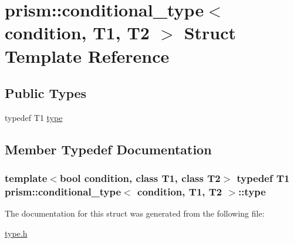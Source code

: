 \hypertarget{structprism_1_1conditional__type}{}\section{prism\+:\+:conditional\+\_\+type$<$ condition, T1, T2 $>$ Struct Template Reference}
\label{structprism_1_1conditional__type}
\subsection*{Public Types}
\begin{DoxyCompactItemize}
\item 
typedef T1 \hyperlink{structprism_1_1conditional__type_a838640ddffc26512ea189c38a23d0cb4}{type}
\end{DoxyCompactItemize}


\subsection{Member Typedef Documentation}
\subsubsection[{\texorpdfstring{type}{type}}]{\setlength{\rightskip}{0pt plus 5cm}template$<$bool condition, class T1, class T2$>$ typedef T1 {\bf prism\+::conditional\+\_\+type}$<$ condition, T1, T2 $>$\+::{\bf type}}\hypertarget{structprism_1_1conditional__type_a838640ddffc26512ea189c38a23d0cb4}{}\label{structprism_1_1conditional__type_a838640ddffc26512ea189c38a23d0cb4}


The documentation for this struct was generated from the following file\+:\begin{DoxyCompactItemize}
\item 
\hyperlink{type_8h}{type.\+h}\end{DoxyCompactItemize}
